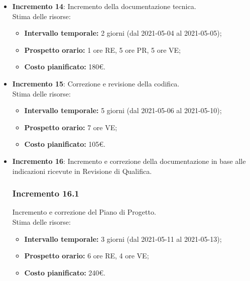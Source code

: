 \begin{itemize}
	\item \textbf{Incremento 14}:
	Incremento della documentazione tecnica.\\
	Stima delle risorse:
	\begin{itemize}
		\item \textbf{Intervallo temporale:} 2 giorni (dal 2021-05-04 al 2021-05-05);
		\item \textbf{Prospetto orario:} 1 ore RE, 5 ore PR, 5 ore VE;
		\item \textbf{Costo pianificato:} 180€.
	\end{itemize}
\item \textbf{Incremento 15}:
Correzione e revisione della codifica.\\
Stima delle risorse:
\begin{itemize}
	\item \textbf{Intervallo temporale:} 5 giorni (dal 2021-05-06 al 2021-05-10);
	\item \textbf{Prospetto orario:} 7 ore VE;
	\item \textbf{Costo pianificato:} 105€.
\end{itemize}

\item \textbf{Incremento 16}:
Incremento e correzione della documentazione in base alle indicazioni ricevute in Revisione di Qualifica.
\subsubsection{Incremento 16.1}
Incremento e correzione del Piano di Progetto.\\
Stima delle risorse:
\begin{itemize}
	\item \textbf{Intervallo temporale:} 3 giorni (dal 2021-05-11 al 2021-05-13);
	\item \textbf{Prospetto orario:} 6 ore RE, 4 ore VE;
	\item \textbf{Costo pianificato:} 240€.
\end{itemize}

\end{itemize}

